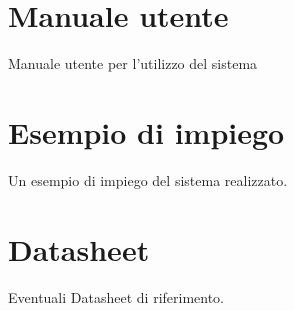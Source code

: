 \documentclass[openany]{book}
\begin{document}
\chapter{Manuale utente}
Manuale utente per l’utilizzo del sistema

\chapter{Esempio di impiego}
Un esempio di impiego del sistema realizzato.

\chapter{Datasheet}
Eventuali Datasheet di riferimento.

\backmatter
\printbibliography[nottype=misc,title={Bibliografia},heading=bibintoc]
\printbibliography[type=misc,title={Sitografia},heading=bibintoc]

\newpage
{}

\end{document}
